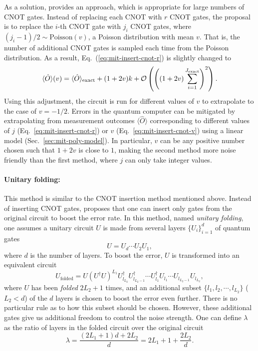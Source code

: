 As a solution, \citet{heResourceEfficientZero2020} provides an approach, which is appropriate for large numbers of CNOT gates. Instead of replacing each CNOT with $r$ CNOT gates, the proposal is to replace the $i$-th CNOT gate with $j_{i}$ CNOT gates, where $(j_i - 1)/2 \sim \mathrm{Poisson}( v)$, a Poisson distribution with mean $v$. That is, the number of additional CNOT gates is sampled each time from the Poisson distribution. As a result, Eq.~(\ref{eq:mit-insert-cnot-r}) is slightly changed to
\begin{equation}
    \label{eq:mit-insert-cnot-v}
    \langle \hat{O} \rangle( v) =\langle \hat{O} \rangle_{\mathrm{exact}} +(1+2v) k +\mathcal{O}\left(\left((1+2v)\sum_{i=1}^{J_\mathrm{exact}}\right)^{2}\right) .
\end{equation}
Using this adjustment, the circuit is run for different values of $v$ to extrapolate to the case of $v=-1/2$. Errors in the quantum computer can be mitigated by extrapolating from measurement outcomes $\langle \hat{O} \rangle$ corresponding to different values of $j$ (Eq.~\ref{eq:mit-insert-cnot-r}) or $v$ (Eq.~\ref{eq:mit-insert-cnot-v}) using a linear model (Sec.~\ref{sec:mit-poly-model}). In particular, $v$ can be any positive number chosen such that $1+2v$ is close to $1$, making the second method more noise friendly than the first method, where $j$ can only take integer values.

\paragraph{Unitary folding:}
This method is similar to the CNOT insertion method mentioned above. Instead of inserting CNOT gates,
\citet{giurgica-tironDigitalZeroNoise2020} proposes that one can insert only gates from the original circuit to boost the error rate. In this method, named \textit{unitary folding}, one assumes a unitary circuit $U$ is made from several layers $\{U_i\}_{i=1}^d$ of quantum gates
\begin{equation}
    U = U_d \cdots U_2 U_1,
\end{equation}
where $d$ is the number of layers. To boost the error, $U$ is transformed into an equivalent circuit
\begin{equation}
    U_{\mathrm{folded}} =U(U^{\dagger } U)^{L_{1}} U_{l_{L_{2}}}^{\dagger } U_{l_{L_{2} -1}}^{\dagger } \cdots U_{l_{1}}^{\dagger } U_{l_{1}} \cdots U_{l_{L_{2} -1}} U_{l_{L_{2}}} ,
\end{equation}
where $U$ has been \textit{folded} $2L_2+1$ times, and an additional subset $\{l_1,l_2,\cdots, l_{L_2}\}$ ($L_2<d$) of the $d$ layers is chosen to boost the error even further. There is no particular rule as to how this subset should be chosen. However, these additional gates give us additional freedom to control the noise strength. One can define $\lambda$ as the ratio of layers in the folded circuit over the original circuit
\begin{equation}
    \lambda = \frac{(2L_1+1)d + 2L_2}{d} = 2L_1+1 + \frac{2L_2}{d}.
\end{equation}

